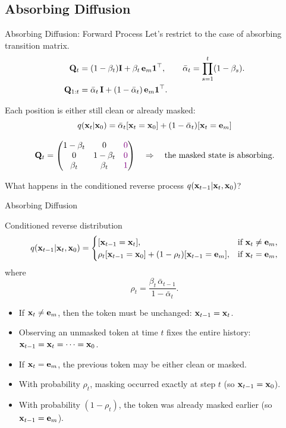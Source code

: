 \documentclass{beamer}
\renewcommand{\eqpause}{}
\begin{document}
\subsection{Absorbing Diffusion}
\begin{frame}{Absorbing Diffusion: Forward Process}
	Let's restrict to the case of absorbing transition matrix.
	\vspace{-0.3cm}
	\begin{align*}
		\mathbf{Q}_t &= (1-\beta_t)\mathbf{I} + \beta_t\, \mathbf{e}_m \mathbf{1}^\top,
		\qquad
		\bar\alpha_t = \prod_{s=1}^t (1-\beta_s). \\
		\mathbf{Q}_{1:t} &= \bar\alpha_t\,\mathbf{I} + (1-\bar\alpha_t)\,\mathbf{e}_m \mathbf{1}^\top.
	\end{align*}
	\eqpause
	Each position is either still clean or already masked:
	\[
		q(\mathbf{x}_t | \mathbf{x}_0) = \bar\alpha_t [\mathbf{x}_t = \mathbf{x}_0] + (1 - \bar\alpha_t) [\mathbf{x}_t = \mathbf{e}_m]
	\]
	\eqpause
	\[
		\mathbf{Q}_t =
		\begin{pmatrix}
			1-\beta_t & 0           & \color{violet}{0} \\
			0           & 1-\beta_t & \color{violet}{0} \\
			\beta_t     & \beta_t     & \color{violet}{1}
		\end{pmatrix} 
		\quad \Rightarrow \quad 
		\text{the masked state is absorbing.}
	\]
	\eqpause
	What happens in the conditioned reverse process
	$q(\mathbf{x}_{t-1} | \mathbf{x}_t, \mathbf{x}_0)$?
\end{frame}
\begin{frame}{Absorbing Diffusion}
	\begin{block}{Conditioned reverse distribution}
		\vspace{-0.5cm}
		\[
			q(\mathbf{x}_{t-1} | \mathbf{x}_t, \mathbf{x}_0) =
			\begin{cases}
				[\mathbf{x}_{t-1} = \mathbf{x}_t], 
				& \text{if } \mathbf{x}_t \neq \mathbf{e}_m, \\
				\rho_t[\mathbf{x}_{t-1} = \mathbf{x}_0] + (1-\rho_t)[\mathbf{x}_{t-1} = \mathbf{e}_m], 
				& \text{if } \mathbf{x}_t = \mathbf{e}_m,
			\end{cases}
		\]
		where
		\[
		\rho_t = \frac{\beta_t\,\bar\alpha_{t-1}}{1-\bar\alpha_t}.
		\]
	\end{block}
	\eqpause
	\begin{itemize}
		\item If $\mathbf{x}_t \neq \mathbf{e}_m$, then the token must be unchanged:
		$\mathbf{x}_{t-1} = \mathbf{x}_t$.
		\item Observing an unmasked token at time $t$ fixes the entire history:
		$\mathbf{x}_{t-1} = \mathbf{x}_t = \cdots = \mathbf{x}_0$.
		\eqpause
		\item If $\mathbf{x}_t = \mathbf{e}_m$, the previous token may be either clean or masked.
		\item With probability $\rho_t$, masking occurred exactly at step $t$
		(so $\mathbf{x}_{t-1} = \mathbf{x}_0$).
        \item With probability $(1 - \rho_t)$, the token was already masked earlier
		(so $\mathbf{x}_{t-1} = \mathbf{e}_m$).
	\end{itemize}
\end{frame}
\end{document}
